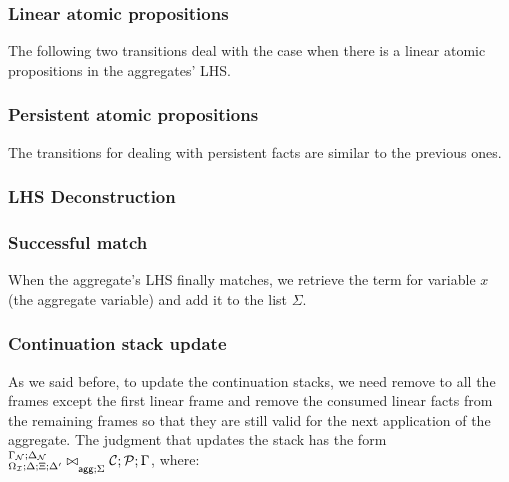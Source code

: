 \subsubsection{Linear atomic propositions}

The following two transitions deal with the case when there is a linear
atomic propositions in the aggregates' LHS.



\subsubsection{Persistent atomic propositions}

The transitions for dealing with persistent facts are similar to the previous
ones.



\subsubsection{LHS Deconstruction}




\subsubsection{Successful match}

When the aggregate's LHS finally matches, we retrieve the term for variable $x$
(the aggregate variable) and add it to the list $\Sigma$.



\subsubsection{Continuation stack update}

As we said before, to update the continuation stacks, we need remove to all the
frames except the first linear frame and remove the consumed linear facts from
the remaining frames so that they are still valid for the next application of
the aggregate.  The judgment that updates the stack has the form
${{}^{\Gamma_{\mathcal{N}} ; \Delta_{\mathcal{N}}}_{\Omega_{\mathcal{I}} ; \Delta; \Xi; \Delta'}\bowtie}_{\mathsf{agg} ; \Sigma} \; \mathcal{C};
   \mathcal{P} ; \Gamma$, where:

